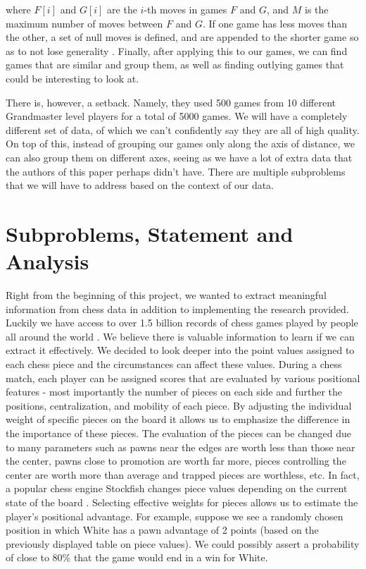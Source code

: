 \documentclass[12pt]{article}
\begin{document}
    where $F[i]$ and $G[i]$ are the $i$-th moves in games $F$ and $G$, and $M$ is the maximum number of moves between $F$ and $G$. If one game has less moves than the other, a set of null moves is defined, and are appended to the shorter game so as to not lose generality \cite{main}. Finally, after applying this to our games, we can find games that are similar and group them, as well as finding outlying games that could be interesting to look at.

    There is, however, a setback. Namely, they used 500 games from 10 different Grandmaster level players for a total of 5000 games. We will have a completely different set of data, of which we can't confidently say they are all of high quality. On top of this, instead of grouping our games only along the axis of distance, we can also group them on different axes, seeing as we have a lot of extra data that the authors of this paper perhaps didn't have. There are multiple subproblems that we will have to address based on the context of our data.

    \section{Subproblems, Statement and Analysis}

    Right from the beginning of this project, we wanted to extract meaningful information from chess data in addition to implementing the research provided. Luckily we have access to over 1.5 billion records of chess games played by people all around the world \cite{lichessdb}. We believe there is valuable information to learn if we can extract it effectively. We decided to look deeper into the point values assigned to each chess piece and the circumstances can affect these values. During a chess match, each player can be assigned scores that are evaluated by various positional features - most importantly the number of pieces on each side and further the positions, centralization, and mobility of each piece. By adjusting the individual weight of specific pieces on the board it allows us to emphasize the difference in the importance of these pieces. The evaluation of the pieces can be changed due to many parameters such as pawns near the edges are worth less than those near the center, pawns close to promotion are worth far more, pieces controlling the center are worth more than average and trapped pieces are worthless, etc. In fact, a popular chess engine Stockfish changes piece values depending on the current state of the board \cite{stockfish}. Selecting effective weights for pieces allows us to estimate the player's positional advantage. For example, suppose we see a randomly chosen position in which White has a pawn advantage of 2 points (based on the previously displayed table on piece values). We could possibly assert a probability of close to 80\% that the game would end in a win for White.
\end{document}
